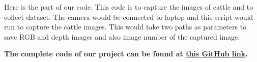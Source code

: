 Here is the part of our code. This code is to capture the images of cattle and to collect dataset. The camera would be connected to laptop and this script would run to capture the cattle images. This would take two paths as parameters to save RGB and depth images and also image number of the captured image. 
\newline




\textbf{The complete code of our project can be found at \href{https://github.com/am02464/InstaWeight}{this GitHub link}.}
